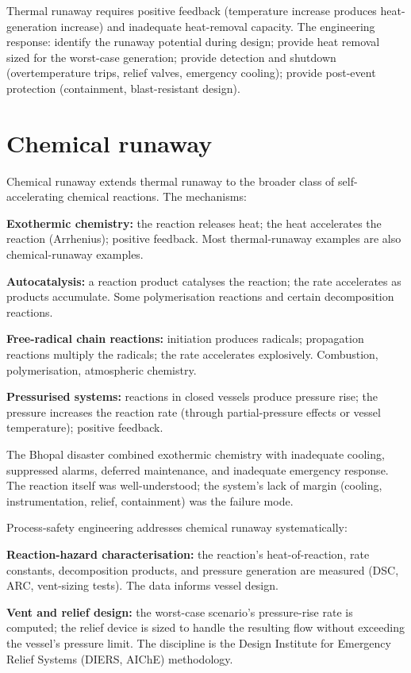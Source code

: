Thermal runaway requires positive feedback (temperature increase produces heat-generation increase) and inadequate heat-removal capacity. The engineering response: identify the runaway potential during design; provide heat removal sized for the worst-case generation; provide detection and shutdown (overtemperature trips, relief valves, emergency cooling); provide post-event protection (containment, blast-resistant design).

\section{Chemical runaway}

Chemical runaway extends thermal runaway to the broader class of self-accelerating chemical reactions. The mechanisms:

\textbf{Exothermic chemistry:} the reaction releases heat; the heat accelerates the reaction (Arrhenius); positive feedback. Most thermal-runaway examples are also chemical-runaway examples.

\textbf{Autocatalysis:} a reaction product catalyses the reaction; the rate accelerates as products accumulate. Some polymerisation reactions and certain decomposition reactions.

\textbf{Free-radical chain reactions:} initiation produces radicals; propagation reactions multiply the radicals; the rate accelerates explosively. Combustion, polymerisation, atmospheric chemistry.

\textbf{Pressurised systems:} reactions in closed vessels produce pressure rise; the pressure increases the reaction rate (through partial-pressure effects or vessel temperature); positive feedback.

The Bhopal disaster combined exothermic chemistry with inadequate cooling, suppressed alarms, deferred maintenance, and inadequate emergency response. The reaction itself was well-understood; the system's lack of margin (cooling, instrumentation, relief, containment) was the failure mode.

Process-safety engineering addresses chemical runaway systematically:

\textbf{Reaction-hazard characterisation:} the reaction's heat-of-reaction, rate constants, decomposition products, and pressure generation are measured (DSC, ARC, vent-sizing tests). The data informs vessel design.

\textbf{Vent and relief design:} the worst-case scenario's pressure-rise rate is computed; the relief device is sized to handle the resulting flow without exceeding the vessel's pressure limit. The discipline is the Design Institute for Emergency Relief Systems (DIERS, AIChE) methodology.


